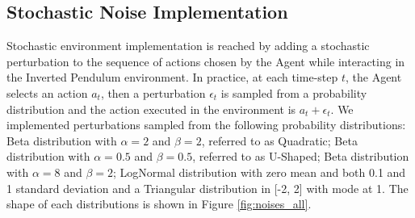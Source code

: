         \subsection{Stochastic Noise Implementation}
        \label{sub:stoch_noise_impl}
            Stochastic environment implementation is reached by adding a stochastic perturbation to the sequence of actions chosen by the Agent while interacting in the Inverted Pendulum environment. In practice, at each time-step $t$, the Agent selects an action $a_t$, then a perturbation $\epsilon_t$ is sampled from a probability distribution and the action executed in the environment is $a_t + \epsilon_t$. We implemented perturbations sampled from the following probability distributions: Beta distribution with $\alpha=2$ and $\beta=2$, referred to as Quadratic; Beta distribution with $\alpha=0.5$ and $\beta=0.5$, referred to as U-Shaped; Beta distribution with $\alpha=8$ and $\beta=2$; LogNormal distribution with zero mean and both 0.1 and 1 standard deviation and a Triangular distribution in [-2, 2] with mode at 1. The shape of each distributions is shown in Figure \ref{fig:noises_all}.
        

